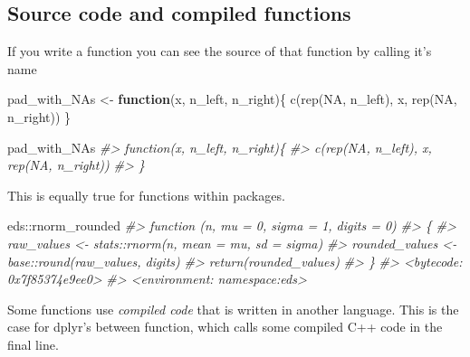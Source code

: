 \documentclass[
  12pt,
]{book}
\newenvironment{Shaded}{\begin{snugshade}}{\end{snugshade}}
\newcommand{\CommentTok}[1]{\textcolor[rgb]{0.56,0.35,0.01}{\textit{#1}}}
\newcommand{\ConstantTok}[1]{\textcolor[rgb]{0.00,0.00,0.00}{#1}}
\newcommand{\ControlFlowTok}[1]{\textcolor[rgb]{0.13,0.29,0.53}{\textbf{#1}}}
\newcommand{\FunctionTok}[1]{\textcolor[rgb]{0.00,0.00,0.00}{#1}}
\newcommand{\NormalTok}[1]{#1}
\newcommand{\OtherTok}[1]{\textcolor[rgb]{0.56,0.35,0.01}{#1}}
\newcommand{\SpecialCharTok}[1]{\textcolor[rgb]{0.00,0.00,0.00}{#1}}
\begin{document}
\hypertarget{source-code-and-compiled-functions}{%
\subsection{Source code and compiled functions}\label{source-code-and-compiled-functions}}

If you write a function you can see the source of that function by calling it's name

\begin{Shaded}
\begin{Highlighting}[]
\NormalTok{pad\_with\_NAs }\OtherTok{\textless{}{-}} \ControlFlowTok{function}\NormalTok{(x, n\_left, n\_right)\{}
  \FunctionTok{c}\NormalTok{(}\FunctionTok{rep}\NormalTok{(}\ConstantTok{NA}\NormalTok{, n\_left), x, }\FunctionTok{rep}\NormalTok{(}\ConstantTok{NA}\NormalTok{, n\_right))}
\NormalTok{\}}
\end{Highlighting}
\end{Shaded}

\begin{Shaded}
\begin{Highlighting}[]
\NormalTok{pad\_with\_NAs}
\CommentTok{\#\textgreater{} function(x, n\_left, n\_right)\{}
\CommentTok{\#\textgreater{}   c(rep(NA, n\_left), x, rep(NA, n\_right))}
\CommentTok{\#\textgreater{} \}}
\end{Highlighting}
\end{Shaded}

This is equally true for functions within packages.

\begin{Shaded}
\begin{Highlighting}[]
\NormalTok{eds}\SpecialCharTok{::}\NormalTok{rnorm\_rounded}
\CommentTok{\#\textgreater{} function (n, mu = 0, sigma = 1, digits = 0) }
\CommentTok{\#\textgreater{} \{}
\CommentTok{\#\textgreater{}     raw\_values \textless{}{-} stats::rnorm(n, mean = mu, sd = sigma)}
\CommentTok{\#\textgreater{}     rounded\_values \textless{}{-} base::round(raw\_values, digits)}
\CommentTok{\#\textgreater{}     return(rounded\_values)}
\CommentTok{\#\textgreater{} \}}
\CommentTok{\#\textgreater{} \textless{}bytecode: 0x7f85374e9ee0\textgreater{}}
\CommentTok{\#\textgreater{} \textless{}environment: namespace:eds\textgreater{}}
\end{Highlighting}
\end{Shaded}

Some functions use \emph{compiled code} that is written in another language. This is the case for dplyr's between function, which calls some compiled C++ code in the final line.
\end{document}
